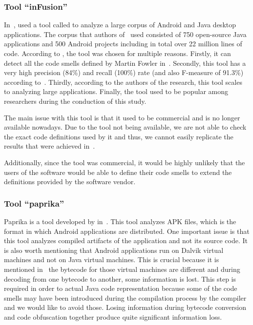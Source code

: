 \subsubsection{Tool ``inFusion''}\label{subsec:toolsay}

In~\cite{mannan2016understanding}, \citeauthor{mannan2016understanding} used a tool called  to analyze a large
corpus of Android and Java desktop applications.
The corpus that authors of~\cite{mannan2016understanding} used consisted of 750 open-source Java applications and 500 Android projects including in total over 22 million lines of code.
According to \citeauthor{mannan2016understanding}, the tool was chosen for multiple reasons.
Firstly, it can detect all the code smells defined by Martin Fowler in~\cite{refactoring-fowler}.
Secondly, this tool has a very high precision (84\%) and recall (100\%) rate (and also F-measure of 91.3\%) according to~\cite{ahmed2015empirical}.
Thirdly, according to the authors of the research, this tool scales to analyzing large applications.
Finally, the tool used to be popular among researchers during the conduction of this study.

The main issue with this tool is that it used to be commercial and is no longer available nowadays.
Due to the tool not being available, we are not able to check the exact code definitions used by it and thus, we cannot
easily replicate the results that were achieved in~\cite{mannan2016understanding}.

Additionally, since the tool was commercial, it would be highly unlikely that the users of the software would
be able to define their code smells to extend the definitions provided by the software vendor.

\subsubsection{Tool ``paprika''}

Paprika is a tool developed by \citeauthor{paprika-paper} in~\cite{paprika-paper}.
This tool analyzes APK files, which is the format in which Android applications are distributed.
One important issue is that this tool analyzes compiled artifacts of the application and not its source code.
It is also worth mentioning that Android applications run on Dalvik virtual machines and not on Java virtual machines.
This is crucial because it is mentioned in~\cite{paprika-paper} the bytecode for those virtual machines
are different and during decoding from one bytecode to another, some information is lost.
This step is required in order to actual Java code representation because some of the code smells
may have been introduced during the compilation process by the compiler and we would like to avoid those.
Losing information during bytecode conversion and code obfuscation together produce quite significant information loss.


